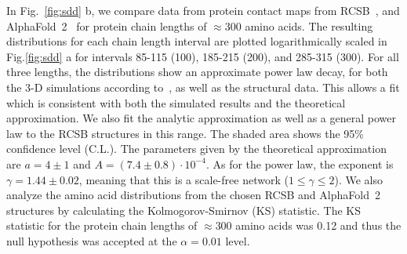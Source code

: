 \documentclass[
reprint,
twocolumn,
amsmath,amssymb,superscriptaddress,aps,
pre]{revtex4-1}
\begin{document}
In Fig.~\ref{fig:sdd} b, we compare data from  protein contact maps from RCSB~\cite{PDB}, and AlphaFold~2~\cite{jumper2021highly} for protein chain lengths of $\approx300$ amino acids. The resulting distributions for each chain length interval are plotted logarithmically scaled in Fig.\ref{fig:sdd} a for intervals 85-115 (100), 185-215 (200), and 285-315 (300). For all three lengths, the distributions show an approximate power law decay, for both the 3-D simulations according to~\cite{molkenthin2020self}, as well as the structural data. This allows a fit  which is consistent with both the simulated results and the theoretical approximation. We also fit the analytic approximation as well as a general power law to the RCSB structures in this range. The shaded area shows the 95\% confidence level (C.L.). The parameters given by the theoretical approximation are $a=4 \pm 1$ and $A=(7.4 \pm 0.8)\cdot 10^{-4}$. As for the power law, the exponent is $\gamma=1.44 \pm 0.02$, meaning that this is a scale-free network ($1\leq\gamma\leq2$). We also analyze the amino acid distributions from the chosen RCSB and AlphaFold~2 structures by calculating the Kolmogorov-Smirnov (KS) statistic. The KS statistic for the protein chain lengths of $\approx$300 amino acids was 0.12 and thus the null hypothesis was accepted at the $\alpha=0.01$ level.
\end{document}
